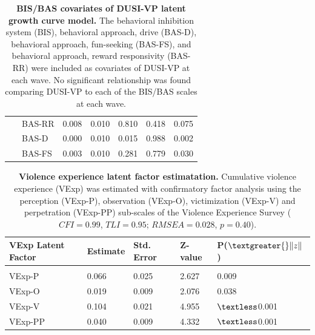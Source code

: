 \documentclass[utf8]{article}
\begin{document}
\begin{table}[h!]
\begin{tabular}{llllll}
\ \ \ BAS-RR                         & 0.008    & 0.010      & 0.810   & 0.418                    & 0.075   \\
\ \ \ BAS-D                          & 0.000    & 0.010      & 0.015   & 0.988                    & 0.002   \\
\ \ \ BAS-FS                         & 0.003    & 0.010      & 0.281   & 0.779                    & 0.030   \\  
\end{tabular}
\caption{\textbf{BIS/BAS covariates of DUSI-VP latent growth curve model.} The behavioral inhibition system (BIS), behavioral approach, drive (BAS-D), behavioral approach, fun-seeking (BAS-FS), and behavioral approach, reward responsivity (BAS-RR) were included as covariates of DUSI-VP at each wave. No significant relationship was found comparing DUSI-VP to each of the BIS/BAS scales at each wave. \label{tab:2}}
\end{table}
\begin{table}[h!]
\begin{tabular}{lllll}
VExp Latent Factor & Estimate & Std. Error & Z-value & P($\textgreater{}\|z\|$) \\ \hline
                   &          &            &         &                          \\
VExp-P             & 0.066    & 0.025      & 2.627   & 0.009                    \\
VExp-O             & 0.019    & 0.009      & 2.076   & 0.038                    \\
VExp-V             & 0.104    & 0.021      & 4.955   & $\textless$0.001                    \\
VExp-PP            & 0.040    & 0.009      & 4.332   & $\textless$0.001                               
\end{tabular}
\caption{\textbf{Violence experience latent factor estimatation.} Cumulative violence experience (VExp) was estimated with confirmatory factor analysis using the perception (VExp-P), observation (VExp-O), victimization (VExp-V) and perpetration (VExp-PP) sub-scales of the Violence Experience Survey ($CFI = 0.99$, $TLI = 0.95$; $RMSEA = 0.028$, $p = 0.40$).  \label{tab:3}}
\end{table} 
\end{document}
